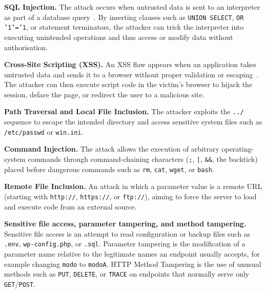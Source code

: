 \documentclass[../main.tex]{subfiles}
\begin{document}
\begin{romanlist}
  \item \textbf{SQL Injection.} The attack occurs when untrusted data is
        sent to an interpreter as part of a database query~\cite{pham2016}.
        By inserting clauses such as \texttt{UNION SELECT}, \texttt{OR
        '1'='1}, or statement terminators, the attacker can trick the
        interpreter into executing unintended operations and thus access or
        modify data without authorisation.

  \item \textbf{Cross-Site Scripting (XSS).} An XSS flaw appears when an
        application takes untrusted data and sends it to a browser without
        proper validation or escaping~\cite{pham2016}. The attacker can
        then execute script code in the victim's browser to hijack the
        session, deface the page, or redirect the user to a malicious site.

  \item \textbf{Path Traversal and Local File Inclusion.} The attacker
        exploits the \texttt{../} sequence to escape the intended directory
        and access sensitive system files such as \texttt{/etc/passwd} or
        \texttt{win.ini}.

  \item \textbf{Command Injection.} The attack allows the execution of
        arbitrary operating-system commands through command-chaining
        characters (\texttt{;}, \texttt{|}, \texttt{\&\&}, the backtick)
        placed before dangerous commands such as \texttt{rm}, \texttt{cat},
        \texttt{wget}, or \texttt{bash}.

  \item \textbf{Remote File Inclusion.} An attack in which a parameter
        value is a remote URL (starting with \texttt{http://},
        \texttt{https://}, or \texttt{ftp://}), aiming to force the server
        to load and execute code from an external source.

  \item \textbf{Sensitive file access, parameter tampering, and method
        tampering.} Sensitive file access is an attempt to read
        configuration or backup files such as \texttt{.env},
        \texttt{wp-config.php}, or \texttt{.sql}. Parameter tampering is the
        modification of a parameter name relative to the legitimate names an
        endpoint usually accepts, for example changing \texttt{modo} to
        \texttt{modoA}. HTTP Method Tampering is the use of unusual methods
        such as \texttt{PUT}, \texttt{DELETE}, or \texttt{TRACE} on
        endpoints that normally serve only \texttt{GET}/\texttt{POST}.
\end{romanlist}
\end{document}

